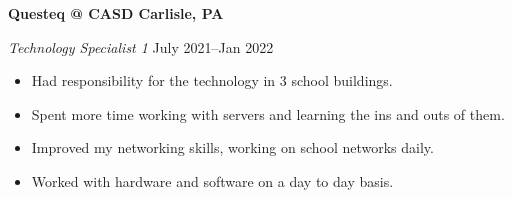 \textbf{Questeq @ CASD \hfill  Carlisle, PA} \par
\textit{Technology Specialist 1} \hfill July 2021--Jan 2022 \par
\begin{itemize}
	\item Had responsibility for the technology in 3 school buildings.
	\item Spent more time working with servers and learning the ins and outs of them.
	\item Improved my networking skills, working on school networks daily.
	\item Worked with hardware and software on a day to day basis.
\end{itemize} \par